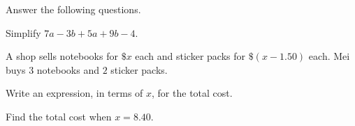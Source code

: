  Answer the following questions.

\begin{subparts}
  \item Simplify $7a-3b+5a+9b-4$.

  \item A shop sells notebooks for $\$x$ each and sticker packs for $\$(x-1.50)$ each. Mei buys $3$ notebooks and $2$ sticker packs.
  \begin{subpartsii}
    \item Write an expression, in terms of $x$, for the total cost.
    \item Find the total cost when $x=8.40$.
  \end{subpartsii}
\end{subparts}


